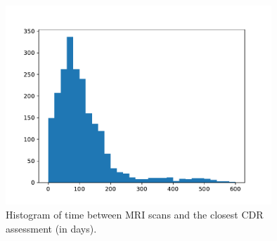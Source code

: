 \documentclass{kththesis}
\begin{document}
\begin{figure}
  \begin{center}
    \includegraphics[width=100mm]{img/mri_cdr_offset.pdf}
    \caption{Histogram of time between MRI scans and the closest CDR assessment (in days).}
    \label{fig:mri_cdr_offset}
  \end{center}
\end{figure}
\end{document}
